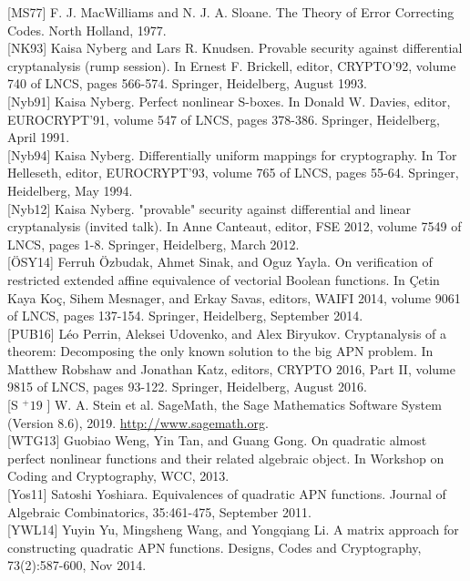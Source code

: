 \documentclass[10pt]{article}
\begin{document}
[MS77] F. J. MacWilliams and N. J. A. Sloane. The Theory of Error Correcting Codes. North Holland, 1977.\\[0pt]
[NK93] Kaisa Nyberg and Lars R. Knudsen. Provable security against differential cryptanalysis (rump session). In Ernest F. Brickell, editor, CRYPTO'92, volume 740 of LNCS, pages 566-574. Springer, Heidelberg, August 1993.\\[0pt]
[Nyb91] Kaisa Nyberg. Perfect nonlinear S-boxes. In Donald W. Davies, editor, EUROCRYPT'91, volume 547 of LNCS, pages 378-386. Springer, Heidelberg, April 1991.\\[0pt]
[Nyb94] Kaisa Nyberg. Differentially uniform mappings for cryptography. In Tor Helleseth, editor, EUROCRYPT'93, volume 765 of LNCS, pages 55-64. Springer, Heidelberg, May 1994.\\[0pt]
[Nyb12] Kaisa Nyberg. "provable" security against differential and linear cryptanalysis (invited talk). In Anne Canteaut, editor, FSE 2012, volume 7549 of LNCS, pages 1-8. Springer, Heidelberg, March 2012.\\[0pt]
[ÖSY14] Ferruh Özbudak, Ahmet Sinak, and Oguz Yayla. On verification of restricted extended affine equivalence of vectorial Boolean functions. In Çetin Kaya Koç, Sihem Mesnager, and Erkay Savas, editors, WAIFI 2014, volume 9061 of LNCS, pages 137-154. Springer, Heidelberg, September 2014.\\[0pt]
[PUB16] Léo Perrin, Aleksei Udovenko, and Alex Biryukov. Cryptanalysis of a theorem: Decomposing the only known solution to the big APN problem. In Matthew Robshaw and Jonathan Katz, editors, CRYPTO 2016, Part II, volume 9815 of LNCS, pages 93-122. Springer, Heidelberg, August 2016.\\[0pt]
[S ${ }^{+} 19$ ] W. A. Stein et al. SageMath, the Sage Mathematics Software System (Version 8.6), 2019. \href{http://www.sagemath.org}{http://www.sagemath.org}.\\[0pt]
[WTG13] Guobiao Weng, Yin Tan, and Guang Gong. On quadratic almost perfect nonlinear functions and their related algebraic object. In Workshop on Coding and Cryptography, WCC, 2013.\\[0pt]
[Yos11] Satoshi Yoshiara. Equivalences of quadratic APN functions. Journal of Algebraic Combinatorics, 35:461-475, September 2011.\\[0pt]
[YWL14] Yuyin Yu, Mingsheng Wang, and Yongqiang Li. A matrix approach for constructing quadratic APN functions. Designs, Codes and Cryptography, 73(2):587-600, Nov 2014.
\end{document}
